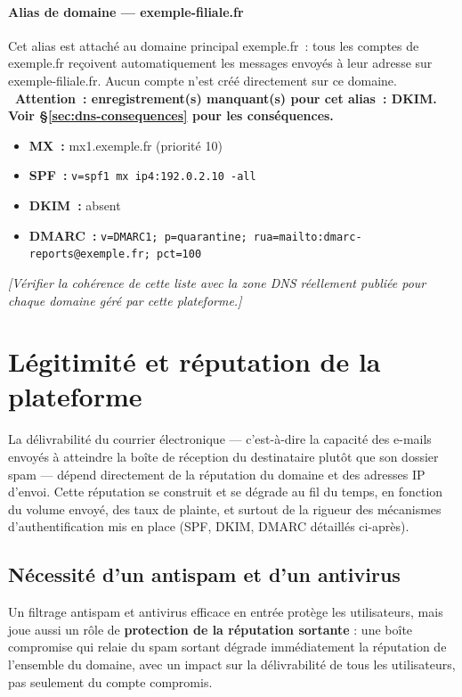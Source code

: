 \documentclass[11pt,a4paper]{report}
\newcommand{\placeholder}[1]{\textit{\textcolor{placeholdercol}{[#1]}}\par\vspace{4pt}}
\newcommand{\dnswarning}[1]{\textbf{\textcolor{placeholdercol}{\textbullet\ Attention~: #1}}\par\vspace{4pt}}
\begin{document}
\paragraph{Alias de domaine --- exemple-\allowbreak{}filiale.\allowbreak{}fr}
Cet alias est attaché au domaine principal exemple.\allowbreak{}fr~: tous les comptes de exemple.\allowbreak{}fr reçoivent automatiquement les messages envoyés à leur adresse sur exemple-\allowbreak{}filiale.\allowbreak{}fr. Aucun compte n'est créé directement sur ce domaine.
\dnswarning{enregistrement(s) manquant(s) pour cet alias~: DKIM. Voir \S\ref{sec:dns-consequences} pour les conséquences.}
\begin{itemize}[nosep]
  \item \textbf{MX~:} mx1.\allowbreak{}exemple.\allowbreak{}fr (priorité 10)  \item \textbf{SPF~:} \texttt{v=spf1 mx ip4:192.\allowbreak{}0.\allowbreak{}2.\allowbreak{}10 -\allowbreak{}all}  \item \textbf{DKIM~:} \textcolor{placeholdercol}{absent}  \item \textbf{DMARC~:} \texttt{v=DMARC1; p=quarantine; rua=mailto:dmarc-\allowbreak{}reports@exemple.\allowbreak{}fr; pct=100}\end{itemize}

\placeholder{Vérifier la cohérence de cette liste avec la zone DNS réellement publiée pour chaque domaine géré par cette plateforme.}

\section{Légitimité et réputation de la plateforme}
\label{sec:reputation}
La délivrabilité du courrier électronique --- c'est-à-dire la capacité des e-mails envoyés à atteindre la boîte de réception du destinataire plutôt que son dossier spam --- dépend directement de la réputation du domaine et des adresses IP d'envoi. Cette réputation se construit et se dégrade au fil du temps, en fonction du volume envoyé, des taux de plainte, et surtout de la rigueur des mécanismes d'authentification mis en place (SPF, DKIM, DMARC détaillés ci-après).

\subsection{Nécessité d'un antispam et d'un antivirus}
Un filtrage antispam et antivirus efficace en entrée protège les utilisateurs, mais joue aussi un rôle de \textbf{protection de la réputation sortante} : une boîte compromise qui relaie du spam sortant dégrade immédiatement la réputation de l'ensemble du domaine, avec un impact sur la délivrabilité de tous les utilisateurs, pas seulement du compte compromis.
\end{document}
